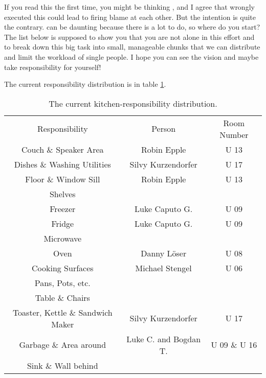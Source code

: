 If you read this the first time, you might be thinking , and I agree that wrongly executed this could lead to firing blame at each other. But the intention is quite the contrary.  can be daunting because there is a lot to do, so where do you start? The list below is supposed to show you that you are not alone in this effort and to break down this big task into small, manageable chunks that we can distribute and limit the workload of single people. I hope you can see the vision and maybe take responsibility for yourself!

The current responsibility distribution is in table \ref{tab:kitchen-responsibilities}.

\begin{table}[htp]
    \centering
    \begin{tabular}{ccc}
        \cline{1-1}
        \rowcolor[HTML]{F89646} 
        Responsibility                    & Person                & Room Number  \\
        Couch \& Speaker Area             & Robin Epple           & U 13         \\ \hline
        Dishes \& Washing Utilities       & Silvy Kurzendorfer    & U 17         \\ \hline
        Floor \& Window Sill              & Robin Epple           & U 13         \\ \hline
        Shelves                           &                       &              \\ \hline
        Freezer                           & Luke Caputo G.        & U 09         \\ \hline
        Fridge                            & Luke Caputo G.        & U 09         \\ \hline
        Microwave                         &                       &              \\ \hline
        Oven                              & Danny Löser           & U 08         \\ \hline
        Cooking Surfaces                  & Michael Stengel       & U 06         \\ \hline
        Pans, Pots, etc.                  &                       &              \\ \hline
        Table \& Chairs                   &                       &              \\ \hline
        Toaster, Kettle \& Sandwich Maker & Silvy Kurzendorfer    & U 17         \\ \hline
        Garbage \& Area around            & Luke C. and Bogdan T. & U 09 \& U 16 \\ \hline
        Sink \& Wall behind               &                       &              \\ \hline
    \end{tabular}
    \caption{The current kitchen-responsibility distribution.}
    \label{tab:kitchen-responsibilities}
\end{table}

